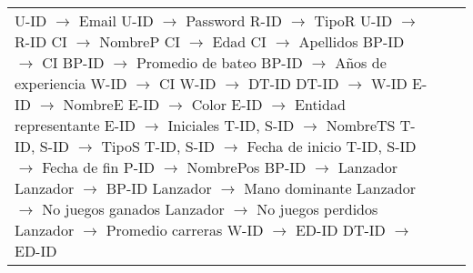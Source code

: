 \documentclass{report}
\begin{document}
\begin{tabularx}{\textwidth}{|X|X|X|}
        U-ID $\rightarrow$ Email \newline 
        U-ID $\rightarrow$ Password \newline 
        R-ID $\rightarrow$ TipoR \newline 
        U-ID $\rightarrow$ R-ID \newline 
        CI $\rightarrow$ NombreP \newline 
        CI $\rightarrow$ Edad \newline 
        CI $\rightarrow$ Apellidos \newline 
        BP-ID $\rightarrow$ CI \newline 
        BP-ID $\rightarrow$ Promedio de bateo \newline 
        BP-ID $\rightarrow$ Años de experiencia \newline 
        W-ID $\rightarrow$ CI \newline 
        W-ID $\rightarrow$ DT-ID \newline 
        DT-ID $\rightarrow$ W-ID \newline 
        E-ID $\rightarrow$ NombreE \newline 
        E-ID $\rightarrow$ Color \newline 
        E-ID $\rightarrow$ Entidad representante \newline 
        E-ID $\rightarrow$ Iniciales \newline 
        T-ID, S-ID $\rightarrow$ NombreTS \newline 
        T-ID, S-ID $\rightarrow$ TipoS \newline 
        T-ID, S-ID $\rightarrow$ Fecha de inicio \newline 
        T-ID, S-ID $\rightarrow$ Fecha de fin \newline 
        P-ID $\rightarrow$ NombrePos \newline 
        BP-ID $\rightarrow$ Lanzador \newline 
        Lanzador $\rightarrow$ BP-ID \newline 
        Lanzador $\rightarrow$ Mano dominante \newline 
        Lanzador $\rightarrow$ No juegos ganados \newline 
        Lanzador $\rightarrow$ No juegos perdidos \newline 
        Lanzador $\rightarrow$ Promedio carreras \newline 
        W-ID $\rightarrow$ ED-ID \newline 
        DT-ID $\rightarrow$ ED-ID \newline 

\end{tabularx}
\end{document}
